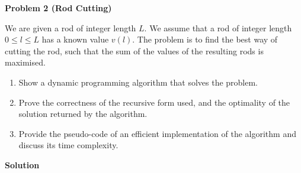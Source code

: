 \documentclass[12pt,a4paper]{report}
\begin{document}
\textbf{Problem 2 (Rod Cutting)}

We are given a rod of integer length $L$. We assume that a rod of integer
length $0 \leq l \leq L$ has a known value $v(l)$. The problem is to find
the best way of cutting the rod, such that the sum of the values of the
resulting rods is maximised.

\begin{enumerate}
  \item[(a)] Show a dynamic programming algorithm that solves the problem.
  \item[(b)] Prove the correctness of the recursive form used, and the optimality of the solution returned by the algorithm.
  \item[(c)] Provide the pseudo-code of an efficient implementation of the
            algorithm and discuss its time complexity.
\end{enumerate}
\textbf{Solution}
\end{document}
